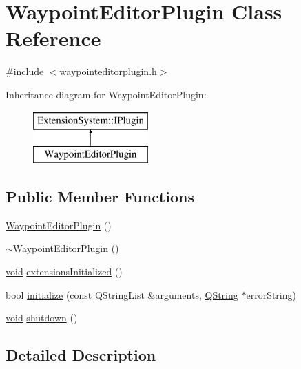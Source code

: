 \hypertarget{class_waypoint_editor_plugin}{\section{\-Waypoint\-Editor\-Plugin \-Class \-Reference}
\label{class_waypoint_editor_plugin}
}


{\ttfamily \#include $<$waypointeditorplugin.\-h$>$}

\-Inheritance diagram for \-Waypoint\-Editor\-Plugin\-:\begin{figure}[H]
\begin{center}
\leavevmode
\includegraphics[height=2.000000cm]{class_waypoint_editor_plugin}
\end{center}
\end{figure}
\subsection*{\-Public \-Member \-Functions}
\begin{DoxyCompactItemize}
\item 
\hyperlink{group___waypoint_editor_gadget_plugin_gab79d5211378f7e8d1c28ac11e4a2be91}{\-Waypoint\-Editor\-Plugin} ()
\item 
\hyperlink{group___waypoint_editor_gadget_plugin_gada6348846ef5c9b1a2778bd9ed769857}{$\sim$\-Waypoint\-Editor\-Plugin} ()
\item 
\hyperlink{group___u_a_v_objects_plugin_ga444cf2ff3f0ecbe028adce838d373f5c}{void} \hyperlink{group___waypoint_editor_gadget_plugin_ga2df66419e41be573431fc273f596cc71}{extensions\-Initialized} ()
\item 
bool \hyperlink{group___waypoint_editor_gadget_plugin_gaaea9c5cb6306b4ee7b48412c09660111}{initialize} (const \-Q\-String\-List \&arguments, \hyperlink{group___u_a_v_objects_plugin_gab9d252f49c333c94a72f97ce3105a32d}{\-Q\-String} $\ast$error\-String)
\item 
\hyperlink{group___u_a_v_objects_plugin_ga444cf2ff3f0ecbe028adce838d373f5c}{void} \hyperlink{group___waypoint_editor_gadget_plugin_ga4fdf75a1aea39e6e89f5fe83b8b812f9}{shutdown} ()
\end{DoxyCompactItemize}


\subsection{\-Detailed \-Description}


